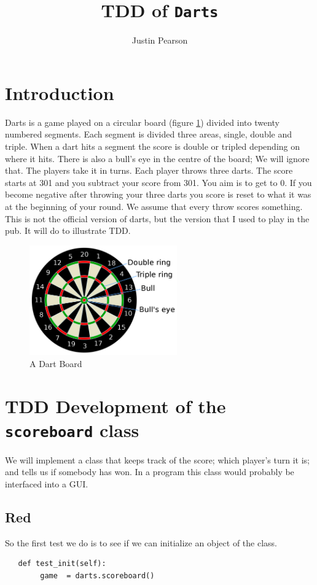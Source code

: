 \documentclass{paper}
\title{TDD of  {\tt Darts}}
\author{Justin Pearson}
\begin{document}
\maketitle
\section{Introduction}
Darts is a game played on a circular board (figure \ref{fig:dartboard}) divided into twenty
numbered  segments. Each segment is divided three areas, single,
double and triple. When a dart hits a segment the score is double or
tripled depending on where it hits.   There is also a bull's eye in
the centre of the board; We will  ignore that.   The players take it in
turns. Each player throws three darts. The score starts at 301 and you
subtract your score from 301. You aim is to get to 0. If you become
negative after throwing your three darts you score is reset to what it
was at the beginning of your round. We assume that every throw scores
something. This is not the official version of darts, but the version
that I used to play in the pub. It will do to illustrate TDD.

\begin{figure}[htb]
  \centering
  \includegraphics[height=1.86in,width=2.5in]{board.png}
  \caption{A Dart Board}
  \label{fig:dartboard}
\end{figure}
\section{TDD Development of the {\tt scoreboard} class}
We will implement a class that keeps track of the score; which
player's turn it is; and tells us if somebody has won. In a program
this class would probably be interfaced into a GUI. 
\subsection{Red}
So the first test we do is to see if we can initialize an object of
the class.
\begin{lstlisting}
   def test_init(self):
        game  = darts.scoreboard()
\end{lstlisting}
\end{document}
